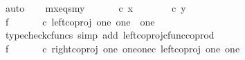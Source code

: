 \begin{isabellebody}
\ auto\isanewline
\isanewline
\ \ \isamarkupfalse%
\ mx{\isacharunderscore}{\kern0pt}eqs{\isacharunderscore}{\kern0pt}my{\isacharcolon}{\kern0pt}\ {\isachardoublequoteopen}{\isasymlangle}{\isasymt}{\isacharcomma}{\kern0pt}{\isasymt}{\isasymrangle}\ {\isasymamalg}\ {\isasymlangle}{\isasymf}{\isacharcomma}{\kern0pt}\ {\isasymf}{\isasymrangle}\ {\isasymamalg}\ {\isasymlangle}{\isasymf}{\isacharcomma}{\kern0pt}{\isasymt}{\isasymrangle}\ {\isasymcirc}\isactrlsub c\ x\ {\isacharequal}{\kern0pt}\ {\isasymlangle}{\isasymt}{\isacharcomma}{\kern0pt}{\isasymt}{\isasymrangle}\ {\isasymamalg}\ {\isasymlangle}{\isasymf}{\isacharcomma}{\kern0pt}\ {\isasymf}{\isasymrangle}\ {\isasymamalg}\ {\isasymlangle}{\isasymf}{\isacharcomma}{\kern0pt}{\isasymt}{\isasymrangle}\ {\isasymcirc}\isactrlsub c\ y{\isachardoublequoteclose}\isanewline
\isanewline
\ \ \isamarkupfalse%
\ f{}{\isacharcolon}{\kern0pt}\ {\isachardoublequoteopen}{\isasymlangle}{\isasymt}{\isacharcomma}{\kern0pt}{\isasymt}{\isasymrangle}\ {\isasymamalg}\ {\isasymlangle}{\isasymf}{\isacharcomma}{\kern0pt}\ {\isasymf}{\isasymrangle}\ {\isasymamalg}\ {\isasymlangle}{\isasymf}{\isacharcomma}{\kern0pt}{\isasymt}{\isasymrangle}\ {\isasymcirc}\isactrlsub c\ left{\isacharunderscore}{\kern0pt}coproj\ one\ {\isacharparenleft}{\kern0pt}one\ {\isasymCoprod}\ one{\isacharparenright}{\kern0pt}\ {\isacharequal}{\kern0pt}\ {\isasymlangle}{\isasymt}{\isacharcomma}{\kern0pt}{\isasymt}{\isasymrangle}{\isachardoublequoteclose}\isanewline
\ \ \ \ \isamarkupfalse%
\ {\isacharparenleft}{\kern0pt}typecheck{\isacharunderscore}{\kern0pt}cfuncs{\isacharcomma}{\kern0pt}\ simp\ add{\isacharcolon}{\kern0pt}\ left{\isacharunderscore}{\kern0pt}coproj{\isacharunderscore}{\kern0pt}cfunc{\isacharunderscore}{\kern0pt}coprod{\isacharparenright}{\kern0pt}\isanewline
\ \ \isamarkupfalse%
\ f{}{\isacharcolon}{\kern0pt}\ {\isachardoublequoteopen}{\isasymlangle}{\isasymt}{\isacharcomma}{\kern0pt}{\isasymt}{\isasymrangle}\ {\isasymamalg}\ {\isasymlangle}{\isasymf}{\isacharcomma}{\kern0pt}\ {\isasymf}{\isasymrangle}\ {\isasymamalg}\ {\isasymlangle}{\isasymf}{\isacharcomma}{\kern0pt}{\isasymt}{\isasymrangle}\ {\isasymcirc}\isactrlsub c\ {\isacharparenleft}{\kern0pt}right{\isacharunderscore}{\kern0pt}coproj\ one\ {\isacharparenleft}{\kern0pt}one{\isasymCoprod}one{\isacharparenright}{\kern0pt}{\isasymcirc}\isactrlsub c\ left{\isacharunderscore}{\kern0pt}coproj\ one\ one{\isacharparenright}{\kern0pt}\ {\isacharequal}{\kern0pt}\ {\isasymlangle}{\isasymf}{\isacharcomma}{\kern0pt}\ {\isasymf}{\isasymrangle}{\isachardoublequoteclose}\isanewline

\end{isabellebody}
